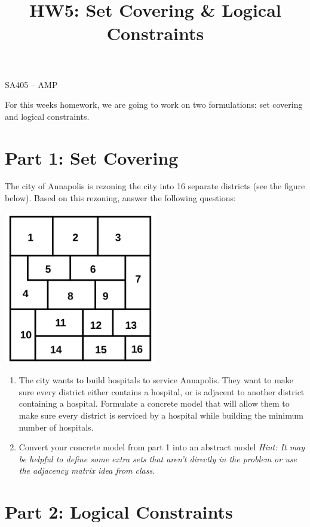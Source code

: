 \documentclass[11pt]{article}
\makeatletter
\theoremstyle{definition}
\renewcommand{\maketitle}{
  \noindent SA405 -- AMP 

  \begin{center}\Large{\textbf{\@title}}\end{center}
}
\makeatother
\begin{document}
  
\title{HW5: Set Covering \& Logical Constraints}


\maketitle

For this weeks homework, we are going to work on two formulations: set covering and logical constraints. 

\section{Part 1: Set Covering}

The city of Annapolis is rezoning the city into 16 separate districts (see the figure below). Based on this rezoning, answer the following questions:

\begin{center} 
\includegraphics[width=0.5\textwidth]{SetCoveringProblemFig.pdf}
\end{center}

\begin{enumerate}
\item The city wants to build hospitals to service Annapolis. They want to make sure every district either contains a hospital, or is adjacent to another district containing a hospital. Formulate a concrete model that will allow them to make sure every district is serviced by a hospital while building the minimum number of hospitals.
\item Convert your concrete model from part 1 into an abstract model \emph{Hint: It may be helpful to define some extra sets that aren't directly in the problem or use the adjacency matrix idea from class}.
\end{enumerate}

\newpage

\section{Part 2: Logical Constraints}
\end{document}
